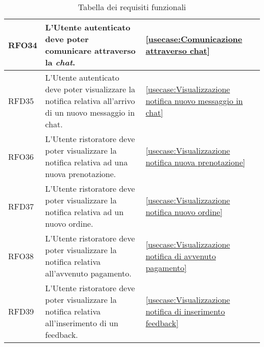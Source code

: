 \begin{table}[H]
\begin{tabularx}{\textwidth}{l|X|p{2cm}}
		\hline
		RFO34       & L'Utente autenticato deve poter comunicare attraverso la \textit{chat}.                                           & \autoref{usecase:Comunicazione attraverso chat}                                       \\
		\hline
		RFD35       & L'Utente autenticato deve poter visualizzare la notifica relativa all'arrivo di un nuovo messaggio in chat.       & \autoref{usecase:Visualizzazione notifica nuovo messaggio in chat}                    \\
		\hline
		RFO36       & L'Utente ristoratore deve poter visualizzare la notifica relativa ad una nuova prenotazione.                      & \autoref{usecase:Visualizzazione notifica nuova prenotazione}                               \\
		\hline
		RFD37       & L'Utente ristoratore deve poter visualizzare la notifica relativa ad un nuovo ordine.                             & \autoref{usecase:Visualizzazione notifica nuovo ordine}                               \\
		\hline
		RFO38       & L'Utente ristoratore deve poter visualizzare la notifica relativa all'avvenuto pagamento.                         & \autoref{usecase:Visualizzazione notifica di avvenuto pagamento}                      \\
		\hline
		RFD39       & L'Utente ristoratore deve poter visualizzare la notifica relativa all'inserimento di un feedback.                 & \autoref{usecase:Visualizzazione notifica di inserimento feedback}                    \\
	\end{tabularx}
	\caption{Tabella dei requisiti funzionali}
\end{table}



